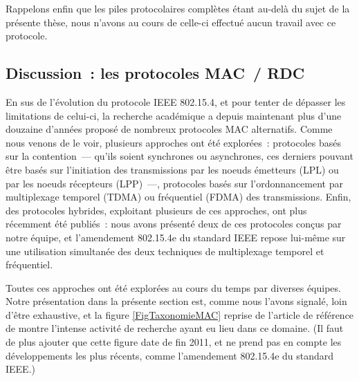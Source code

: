 Rappelons enfin que les piles protocolaires complètes étant au-delà du sujet
de la présente thèse, nous n'avons au cours de celle-ci effectué aucun
travail avec ce protocole.


\subsection{Discussion~: les protocoles MAC~/ RDC}
\label{SubsecDiscussMAC}

En sus de l'évolution du protocole IEEE 802.15.4, et pour tenter de
dépasser les limitations de celui-ci, la recherche académique a depuis
maintenant plus d'une douzaine d'années proposé de nombreux protocoles
MAC alternatifs. Comme nous venons de le voir, plusieurs approches
ont été explorées~: protocoles basés sur la contention~--- qu'ils soient
synchrones ou asynchrones, ces derniers pouvant être basés sur
l'initiation des transmissions par les noeuds émetteurs (LPL) ou
par les noeuds récepteurs (LPP)~---, protocoles basés sur l'ordonnancement
par multiplexage temporel (TDMA) ou fréquentiel (FDMA) des transmissions.
Enfin, des protocoles hybrides, exploitant plusieurs de ces approches,
ont plus récemment été publiés~: nous avons présenté deux de ces
protocoles conçus par notre équipe, et l'amendement 802.15.4e du
standard IEEE repose lui-même sur une utilisation simultanée des
deux techniques de multiplexage temporel et fréquentiel.

Toutes ces approches ont été explorées au cours du temps par diverses
équipes. Notre présentation dans la présente section est, comme nous
l'avons signalé, loin d'être exhaustive, et la figure \vref{FigTaxonomieMAC}
reprise de l'article de référence de \cite{Evolution-MAC-WSN-Survey-2013}
montre l'intense activité de recherche ayant eu lieu dans ce domaine.
(Il faut de plus ajouter que cette figure date de fin 2011, et
ne prend pas en compte les développements les plus récents,
comme l'amendement 802.15.4e du standard IEEE.)

